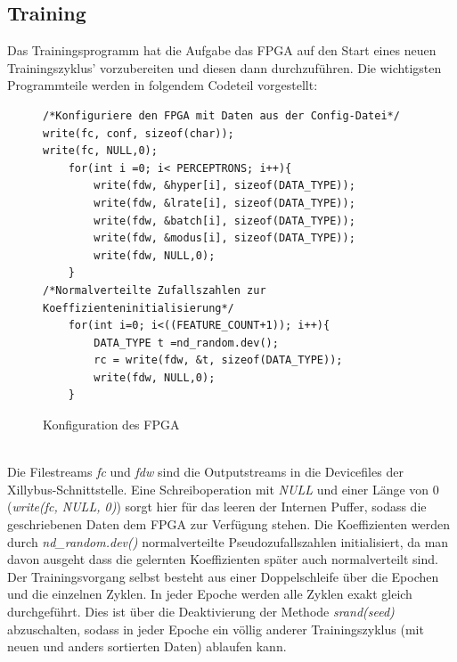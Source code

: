 \subsection{Training}
Das Trainingsprogramm hat die Aufgabe das FPGA auf den Start eines neuen Trainingszyklus' vorzubereiten und diesen dann durchzuführen. Die wichtigsten Programmteile werden in folgendem Codeteil vorgestellt:
\begin{figure}[ht]
\centering
\begin{lstlisting}
/*Konfiguriere den FPGA mit Daten aus der Config-Datei*/
write(fc, conf, sizeof(char));
write(fc, NULL,0);
	for(int i =0; i< PERCEPTRONS; i++){
		write(fdw, &hyper[i], sizeof(DATA_TYPE));
		write(fdw, &lrate[i], sizeof(DATA_TYPE));
		write(fdw, &batch[i], sizeof(DATA_TYPE));
		write(fdw, &modus[i], sizeof(DATA_TYPE));
		write(fdw, NULL,0);
	}
/*Normalverteilte Zufallszahlen zur Koeffizienteninitialisierung*/
	for(int i=0; i<((FEATURE_COUNT+1)); i++){
		DATA_TYPE t =nd_random.dev();
		rc = write(fdw, &t, sizeof(DATA_TYPE));
		write(fdw, NULL,0);
	}
\end{lstlisting}
\caption{Konfiguration des FPGA}
\end{figure}\\
Die Filestreams \textit{fc} und \textit{fdw} sind die Outputstreams in die Devicefiles der Xillybus-Schnittstelle. Eine Schreiboperation mit \textit{NULL} und einer Länge von 0 (\textit{write(fc, NULL, 0)}) sorgt hier für das leeren der Internen Puffer, sodass die geschriebenen Daten dem FPGA zur Verfügung stehen. Die Koeffizienten werden durch \textit{nd\_random.dev()} normalverteilte Pseudozufallszahlen initialisiert, da man davon ausgeht dass die gelernten Koeffizienten später auch normalverteilt sind.\\
Der Trainingsvorgang selbst besteht aus einer Doppelschleife über die Epochen und die einzelnen Zyklen. In jeder Epoche werden alle Zyklen exakt gleich durchgeführt. Dies ist über die Deaktivierung der Methode \textit{srand(seed)} abzuschalten, sodass in jeder Epoche ein völlig anderer Trainingszyklus (mit neuen und anders sortierten Daten) ablaufen kann.\\
